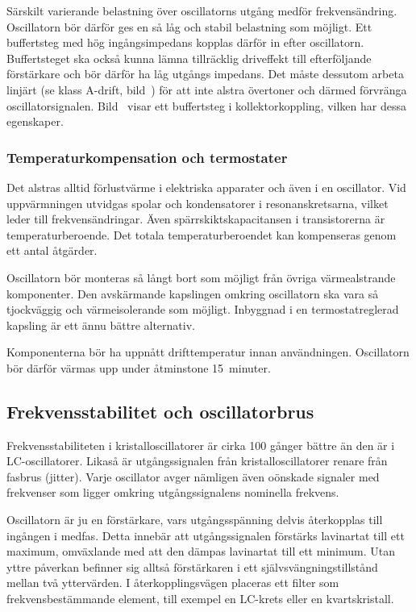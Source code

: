Särskilt varierande belastning över oscillatorns utgång medför frekvensändring.
Oscillatorn bör därför ges en så låg och stabil belastning som möjligt.
Ett buffertsteg med hög ingångsimpedans kopplas därför in efter oscillatorn.
Buffertsteget ska också kunna lämna tillräcklig driveffekt till efterföljande 
förstärkare och bör därför ha låg utgångs impedans.
Det måste dessutom arbeta linjärt (se klass A-drift, bild~)
för att inte alstra övertoner och därmed förvränga oscillatorsignalen.
Bild~ visar ett buffertsteg i kollektorkoppling, vilken har
dessa egenskaper.

\subsubsection{Temperaturkompensation och termostater}

Det alstras alltid förlustvärme i elektriska apparater och även i en oscillator.
Vid uppvärmningen utvidgas spolar och kondensatorer i resonanskretsarna,
vilket leder till frekvensändringar.
Även spärrskiktskapacitansen i transistorerna är temperaturberoende.
Det totala temperaturberoendet kan kompenseras genom ett antal åtgärder.

\newpage
Oscillatorn bör monteras så långt bort som möjligt från övriga
värmealstrande komponenter.
Den avskärmande kapslingen omkring oscillatorn ska vara så tjockväggig och
värmeisolerande som möjligt.
Inbyggnad i en termostatreglerad kapsling är ett ännu bättre alternativ.

Komponenterna bör ha uppnått drifttemperatur innan användningen.
Oscillatorn bör därför värmas upp under åtminstone 15~minuter.

\subsection{Frekvensstabilitet och oscillatorbrus}

Frekvensstabiliteten i kristalloscillatorer är cirka 100 gånger bättre än
den är i LC-oscillatorer.
Likaså är utgångssignalen från kristalloscillatorer renare från fasbrus (jitter).
Varje oscillator avger nämligen även oönskade signaler med frekvenser som
ligger omkring utgångssignalens nominella frekvens.

Oscillatorn är ju en förstärkare, vars utgångsspänning delvis
återkopplas till ingången i medfas.
Detta innebär att utgångssignalen förstärks lavinartat till ett maximum,
omväxlande med att den dämpas lavinartat till ett minimum.
Utan yttre påverkan befinner sig alltså förstärkaren i ett
självsvängningstillstånd mellan två yttervärden.
I återkopplingsvägen placeras ett filter som frekvensbestämmande
element, till exempel en LC-krets eller en kvartskristall.

